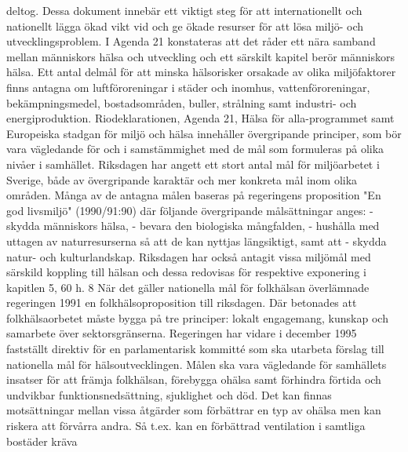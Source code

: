 deltog. Dessa dokument innebär ett viktigt steg för att internationellt och nationellt lägga ökad vikt vid och ge ökade resurser för att lösa miljö- och utvecklingsproblem.
I Agenda 21 konstateras att det råder ett nära samband mellan människors hälsa och utveckling och ett särskilt kapitel berör människors hälsa. Ett antal delmål för att minska hälsorisker orsakade av olika miljöfaktorer finns antagna om luftföroreningar i städer och inomhus, vattenföroreningar, bekämpningsmedel, bostadsområden, buller, strålning samt industri- och energiproduktion.
Riodeklarationen, Agenda 21, Hälsa för alla-programmet samt Europeiska stadgan för miljö och hälsa innehåller övergripande principer, som bör vara vägledande för och i samstämmighet med de mål som formuleras på olika nivåer i samhället.
Riksdagen har angett ett stort antal mål för miljöarbetet i Sverige, både av övergripande karaktär och mer konkreta mål inom olika områden. Många av de antagna målen baseras på regeringens proposition "En god livsmiljö" (1990/91:90) där följande övergripande målsättningar anges:
- skydda människors hälsa,
- bevara den biologiska mångfalden,
- hushålla med uttagen av naturresurserna så att de kan nyttjas längsiktigt, samt att
- skydda natur- och kulturlandskap.
Riksdagen har också antagit vissa miljömål med särskild koppling till hälsan och dessa redovisas för respektive exponering i kapitlen 5, 60 h. 8 När det gäller nationella mål för folkhälsan överlämnade regeringen 1991 en folkhälsoproposition till riksdagen. Där betonades att folkhälsaorbetet måste bygga på tre principer: lokalt engagemang, kunskap och samarbete över sektorsgränserna.
Regeringen har vidare i december 1995 fastställt direktiv för en parlamentarisk kommitté som ska utarbeta förslag till nationella mål för hälsoutvecklingen. Målen ska vara vägledande för samhällets insatser för att främja folkhälsan, förebygga ohälsa samt förhindra förtida och undvikbar funktionsnedsättning, sjuklighet och död.
Det kan finnas motsättningar mellan vissa åtgärder som förbättrar en typ av ohälsa men kan riskera att förvårra andra. Så t.ex. kan en förbättrad ventilation i samtliga bostäder kräva

